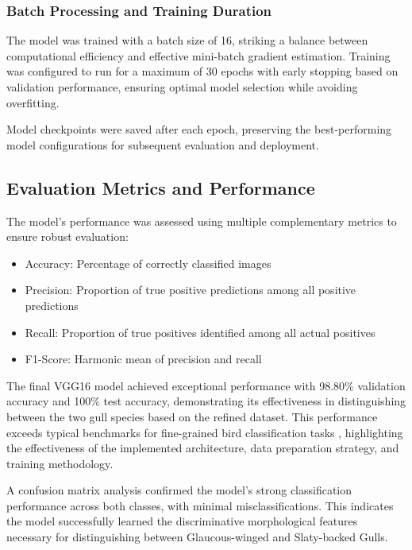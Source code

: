 \documentclass[a4paper,12pt]{article}
\begin{document}
\subsubsection{Batch Processing and Training Duration}

The model was trained with a batch size of 16, striking a balance between computational efficiency and effective mini-batch gradient estimation. Training was configured to run for a maximum of 30 epochs with early stopping based on validation performance, ensuring optimal model selection while avoiding overfitting.

Model checkpoints were saved after each epoch, preserving the best-performing model configurations for subsequent evaluation and deployment.

\subsection{Evaluation Metrics and Performance}

The model's performance was assessed using multiple complementary metrics to ensure robust evaluation:
\begin{itemize}
    \item Accuracy: Percentage of correctly classified images
    \item Precision: Proportion of true positive predictions among all positive predictions
    \item Recall: Proportion of true positives identified among all actual positives
    \item F1-Score: Harmonic mean of precision and recall
\end{itemize}

The final VGG16 model achieved exceptional performance with 98.80\% validation accuracy and 100\% test accuracy, demonstrating its effectiveness in distinguishing between the two gull species based on the refined dataset. This performance exceeds typical benchmarks for fine-grained bird classification tasks \citep{sanchez2019fine}, highlighting the effectiveness of the implemented architecture, data preparation strategy, and training methodology.

A confusion matrix analysis confirmed the model's strong classification performance across both classes, with minimal misclassifications. This indicates the model successfully learned the discriminative morphological features necessary for distinguishing between Glaucous-winged and Slaty-backed Gulls.


\end{document}
